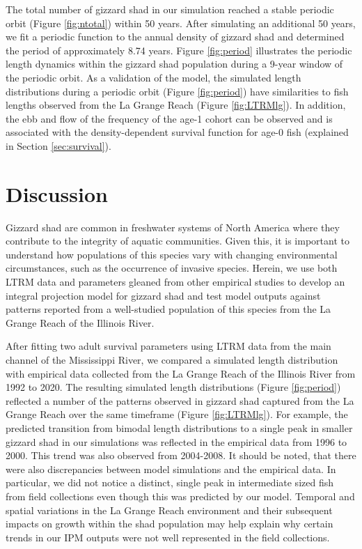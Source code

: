 \documentclass[preprint,review,12pt,authoryear]{elsarticle}
\begin{document}
The total number of gizzard shad in our simulation reached a stable periodic orbit (Figure \ref{fig:ntotal}) within 50 years. 
After simulating an additional 50 years, we fit a periodic function to the annual density of gizzard shad and determined the period of approximately 8.74 years. 
Figure \ref{fig:period} illustrates the periodic length dynamics within the gizzard shad population during a 9-year window of the periodic orbit.  
As a validation of the model, the simulated length distributions during a periodic orbit (Figure \ref{fig:period}) have similarities to fish lengths observed from the La Grange Reach (Figure \ref{fig:LTRMlg}). 
In addition, the ebb and flow of the frequency of the age-1 cohort can be observed and is associated with the density-dependent survival function for age-0 fish (explained in Section \ref{sec:survival}).

\section{Discussion}
Gizzard shad are common in freshwater systems of North America where they contribute to the integrity of aquatic communities. 
Given this, it is important to understand how populations of this species vary with changing environmental circumstances, such as the occurrence of invasive species. 
Herein, we use both LTRM data and parameters gleaned from other empirical studies to develop an integral projection model for gizzard shad and test model outputs against patterns reported from a well-studied population of this species from the La Grange Reach of the Illinois River.   

After fitting two adult survival parameters using LTRM data from the main channel of the Mississippi River, we compared a simulated length distribution with empirical data collected from the La Grange Reach of the Illinois River from 1992 to 2020. 
The resulting simulated length distributions (Figure \ref{fig:period}) reflected a number of the patterns observed in gizzard shad captured from the La Grange Reach over the same timeframe (Figure \ref{fig:LTRMlg}). 
For example, the predicted transition from bimodal length distributions to a single peak in smaller gizzard shad in our simulations was reflected in the empirical data from 1996 to 2000. 
This trend was also observed from 2004-2008.  
It should be noted, that there were also discrepancies between model simulations and the empirical data. 
In particular, we did not notice a distinct, single peak in intermediate sized fish from field collections even though this was predicted by our model. 
Temporal and spatial variations in the La Grange Reach environment and their subsequent impacts on growth within the shad population may help explain why certain trends in our IPM outputs were not well represented in the field collections.   
\end{document}

